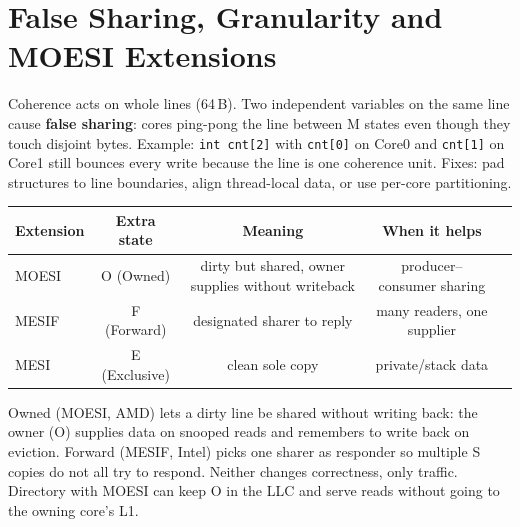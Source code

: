 \begin{center}
\end{center}

\section{False Sharing, Granularity and MOESI Extensions}
Coherence acts on whole lines (64\,B). Two independent variables on the same line cause \textbf{false sharing}: cores ping-pong the line between M states even though they touch disjoint bytes. Example: \texttt{int cnt[2]} with \texttt{cnt[0]} on Core0 and \texttt{cnt[1]} on Core1 still bounces every write because the line is one coherence unit. Fixes: pad structures to line boundaries, align thread-local data, or use per-core partitioning.

\begin{center}
\begin{tabular}{lcccc}
\toprule Extension & Extra state & Meaning & When it helps \\ \midrule
MOESI & O (Owned) & dirty but shared, owner supplies without writeback & producer--consumer sharing \\
MESIF & F (Forward) & designated sharer to reply & many readers, one supplier \\
MESI & E (Exclusive) & clean sole copy & private/stack data \\ \bottomrule
\end{tabular}
\end{center}

Owned (MOESI, AMD) lets a dirty line be shared without writing back: the owner (O) supplies data on snooped reads and remembers to write back on eviction. Forward (MESIF, Intel) picks one sharer as responder so multiple S copies do not all try to respond. Neither changes correctness, only traffic. Directory with MOESI can keep O in the LLC and serve reads without going to the owning core's L1.

